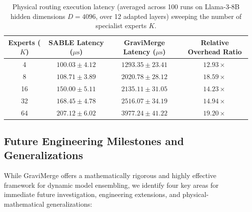 \begin{table}[h]
\centering
\caption{Physical routing execution latency (averaged across 100 runs on Llama-3-8B hidden dimensions $D = 4096$, over 12 adapted layers) sweeping the number of specialist experts $K$.}
\label{tab:latency_scaling}
\vskip 0.05in
\begin{small}
\begin{sc}
\begin{tabular}{cccc}
\toprule
Experts ($K$) & SABLE Latency ($\mu\text{s}$) & GraviMerge Latency ($\mu\text{s}$) & Relative Overhead Ratio \\
\midrule
4 & $100.03 \pm 4.12$ & $1293.35 \pm 23.41$ & $12.93\times$ \\
8 & $108.71 \pm 3.89$ & $2020.78 \pm 28.12$ & $18.59\times$ \\
16 & $150.00 \pm 5.11$ & $2135.11 \pm 31.05$ & $14.23\times$ \\
32 & $168.45 \pm 4.78$ & $2516.07 \pm 34.19$ & $14.94\times$ \\
64 & $207.12 \pm 6.02$ & $3977.24 \pm 41.22$ & $19.20\times$ \\
\bottomrule
\end{tabular}
\end{sc}
\end{small}
\end{table}

\subsection{Future Engineering Milestones and Generalizations}
\label{sec:appendix_future}
While GraviMerge offers a mathematically rigorous and highly effective framework for dynamic model ensembling, we identify four key areas for immediate future investigation, engineering extensions, and physical-mathematical generalizations:

